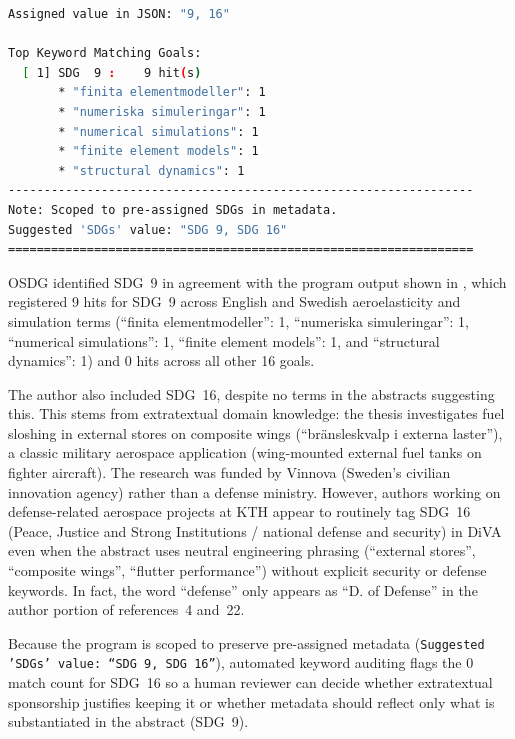 \begin{casestudySection}
\begin{lstlisting}[language={bash}, basicstyle=\footnotesize, escapechar=|, breaklines=true,
    postbreak=\usebox{\lstbreakbox}, caption={Program's output}, label=lst:t_152070Output]
Assigned value in JSON: "9, 16"

Top Keyword Matching Goals:
  [ 1] SDG  9 :    9 hit(s)
       * "finita elementmodeller": 1
       * "numeriska simuleringar": 1
       * "numerical simulations": 1
       * "finite element models": 1
       * "structural dynamics": 1
-----------------------------------------------------------------
Note: Scoped to pre-assigned SDGs in metadata.
Suggested 'SDGs' value: "SDG 9, SDG 16"
=================================================================
\end{lstlisting}

OSDG identified \gls{SDG}~9 in agreement with the program output shown in , which registered \num{9} hits for \gls{SDG}~9 across English and Swedish aeroelasticity and simulation terms (\enquote{\foreignlanguage{swedish}{finita elementmodeller}}: 1, \enquote{\foreignlanguage{swedish}{numeriska simuleringar}}: 1, \enquote{numerical simulations}: 1, \enquote{finite element models}: 1, and \enquote{structural dynamics}: 1) and \num{0} hits across all other \num{16} goals.

The author also included \gls{SDG}~16, despite no terms in the abstracts suggesting this. This stems from extratextual domain knowledge: the thesis investigates fuel sloshing in external stores on composite wings (\enquote{\foreignlanguage{swedish}{bränsleskvalp i externa laster}}), a classic military aerospace application (wing-mounted external fuel tanks on fighter aircraft). The research was funded by Vinnova (Sweden's civilian innovation agency) rather than a defense ministry. However, authors working on defense-related aerospace projects at \gls{KTH} appear to routinely tag \gls{SDG}~16 (Peace, Justice and Strong Institutions / national defense and security) in \gls{DiVA} even when the abstract uses neutral engineering phrasing (\enquote{external stores}, \enquote{composite wings}, \enquote{flutter performance}) without explicit security or defense keywords. In fact, the word \enquote{defense} only appears as \enquote{D. of Defense} in the author portion of references~4 and~22.

Because the program is scoped to preserve pre-assigned metadata (\texttt{Suggested 'SDGs' value: \enquote{SDG 9, SDG 16}}), automated keyword auditing flags the \num{0} match count for \gls{SDG}~16 so a human reviewer can decide whether extratextual sponsorship justifies keeping it or whether metadata should reflect only what is substantiated in the abstract (\gls{SDG}~9).
\end{casestudySection}

